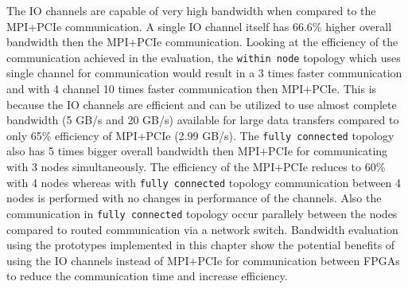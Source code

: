 The IO channels are capable of very high bandwidth when compared to the MPI+PCIe
communication. A single IO channel itself has 66.6\% higher overall bandwidth
then the MPI+PCIe communication. Looking at the efficiency of the communication achieved
in the evaluation, the \texttt{within node} topology which uses single
channel for communication would result in a 3 times faster communication and with 4 channel
10 times faster communication then MPI+PCIe. This is because the IO channels are efficient
and can be utilized to use almost complete bandwidth (5 GB/s and 20 GB/s) available for large data transfers
compared to only 65\% efficiency of MPI+PCIe (2.99 GB/s). The \texttt{fully connected} topology
also has 5 times bigger overall bandwidth then MPI+PCIe for communicating with 3 nodes
simultaneously. The efficiency of the MPI+PCIe reduces to 60\% with 4 nodes whereas
with \texttt{fully connected} topology communication between 4 nodes is performed with
no changes in performance of the channels. Also the communication in \texttt{fully connected}
topology occur parallely between the nodes compared to routed communication via a network switch.
Bandwidth evaluation using the prototypes implemented in this chapter show the potential benefits
of using the IO channels instead of MPI+PCIe for communication between FPGAs to reduce the communication
time and increase efficiency.


